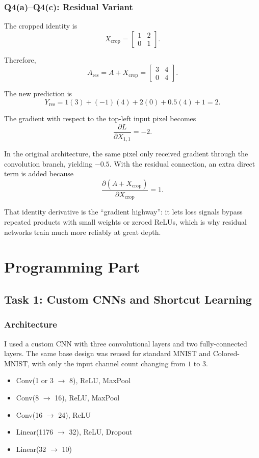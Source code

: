 \documentclass[11pt]{article}
\begin{document}
\subsubsection*{Q4(a)--Q4(c): Residual Variant}

The cropped identity is
\[
X_{\text{crop}}=
\begin{bmatrix}
1 & 2\\
0 & 1
\end{bmatrix}.
\]

Therefore,
\[
A_{\text{res}}=A+X_{\text{crop}}=
\begin{bmatrix}
3 & 4\\
0 & 4
\end{bmatrix}.
\]

The new prediction is
\[
Y_{\text{res}}
=1(3)+(-1)(4)+2(0)+0.5(4)+1
=2.
\]

The gradient with respect to the top-left input pixel becomes
\[
\frac{\partial L}{\partial X_{1,1}}=-2.
\]

In the original architecture, the same pixel only received gradient through the convolution branch, yielding \(-0.5\). With the residual connection, an extra direct term is added because
\[
\frac{\partial (A+X_{\text{crop}})}{\partial X_{\text{crop}}}=1.
\]

That identity derivative is the ``gradient highway'': it lets loss signals bypass repeated products with small weights or zeroed ReLUs, which is why residual networks train much more reliably at great depth.

\section{Programming Part}

\subsection{Task 1: Custom CNNs and Shortcut Learning}

\subsubsection*{Architecture}

I used a custom CNN with three convolutional layers and two fully-connected layers. The
same base design was reused for standard MNIST and Colored-MNIST, with only the input
channel count changing from \(1\) to \(3\).
\begin{itemize}
  \item Conv(1 or 3 \(\rightarrow\) 8), ReLU, MaxPool
  \item Conv(8 \(\rightarrow\) 16), ReLU, MaxPool
  \item Conv(16 \(\rightarrow\) 24), ReLU
  \item Linear(1176 \(\rightarrow\) 32), ReLU, Dropout
  \item Linear(32 \(\rightarrow\) 10)
\end{itemize}
\end{document}
